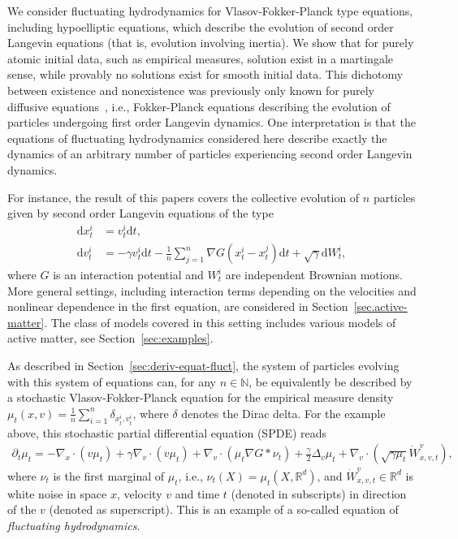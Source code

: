 \documentclass{article}
\newcommand{\dd}{\text{d}}
\newcommand{\R}{\mathbb{R}}
\begin{document}
We consider fluctuating hydrodynamics for Vlasov-Fokker-Planck type equations, including hypoelliptic
equations, which describe the evolution of second order Langevin equations (that is, evolution involving
inertia). We show that for purely atomic initial data, such as empirical measures, solution exist in a
martingale sense, while provably no solutions exist for smooth initial data. This dichotomy between existence
and nonexistence was previously only known for purely diffusive
equations~\cite{Konarovskyi2019a,Konarovskyi2020a}, i.e., Fokker-Planck equations describing the evolution of
particles undergoing first order Langevin dynamics. One interpretation is that the equations of fluctuating
hydrodynamics considered here describe exactly the dynamics of an arbitrary number of particles experiencing
second order Langevin dynamics.

For instance, the result of this papers covers the collective evolution of $n$ particles given by second order
Langevin equations of the type
\begin{align*}              
\dd x_t^i &=  v_t^i \dd t,\\
  \dd v_t^i &=  - \gamma v_t^i \dd t %
              -\frac 1 n \sum_{j=1}^n \nabla G(x_t^i - x_t^j) \dd t
              +  \sqrt{\gamma} \dd W_t^i,
\end{align*} 
where $G$ is an interaction potential and $W_t^i$ are independent Brownian motions. More general settings,
including interaction terms depending on the velocities and nonlinear dependence in the first equation, are
considered in Section~\ref{sec.active-matter}. The class of models covered in this setting includes various
models of active matter, see Section~\ref{sec:examples}.

As described in Section~\ref{sec:deriv-equat-fluct}, the system of particles evolving with this system of
equations can, for any $n\in\mathbb{N}$, be equivalently be described by a stochastic Vlasov-Fokker-Planck
equation for the empirical measure density $\mu_t(x,v) = \frac 1 n \sum_{i=1}^n \delta_{x_t^i, v_t^i}$, where
$\delta$ denotes the Dirac delta. %
For the example above, this stochastic partial differential equation (SPDE) reads
\begin{align} 
\label{intro.VLPDK}
  \partial_t \mu_t = %
  -  \nabla_x \cdot (v \mu_t )  + \gamma\nabla_v \cdot (v \mu_t  )
  + \nabla_v \cdot(\mu_t \nabla G \ast \nu_t ) %
  + \frac{\gamma}{2} \Delta_v \mu_t 
  + \nabla_v \cdot (\sqrt{\gamma\mu_t} \dot W_{x,v,t}^v),
\end{align}
where $\nu_t$ is the first marginal of $\mu_t$, i.e., $\nu_t(X) = \mu_t(X,\R^d)$, and
$\dot W_{x,v,t}^v \in \R^d$ is white noise in space $x$, velocity $v$ and time $t$ (denoted in subscripts) in
direction of the $v$ (denoted as superscript). This is an example of a so-called equation of \emph{fluctuating
  hydrodynamics}.
\end{document}
